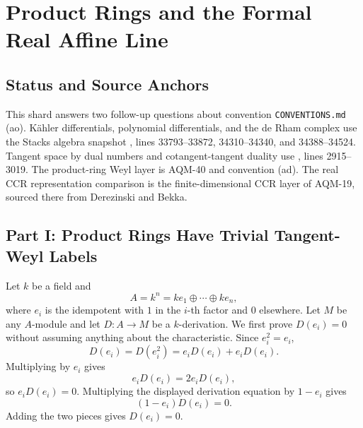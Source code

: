 \section{Product Rings and the Formal Real Affine Line}
\label{sec:product-rings-real-line-cotangent}
\subsection{Status and Source Anchors}
This shard answers two follow-up questions about convention
\texttt{CONVENTIONS.md} (ao).  K\"ahler differentials, polynomial
differentials, and the de Rham complex use the Stacks algebra snapshot
, lines
33793--33872, 34310--34340, and 34388--34524.  Tangent space by dual numbers
and cotangent-tangent duality use
, lines
2915--3019.  The product-ring Weyl layer is AQM-40 and convention (ad).  The
real CCR representation comparison is the finite-dimensional CCR layer of
AQM-19, sourced there from Derezinski and Bekka.
\subsection{Part I: Product Rings Have Trivial Tangent-Weyl Labels}
Let \(k\) be a field and
\[
  A=k^n=k e_1\oplus\cdots\oplus k e_n,
\]
where \(e_i\) is the idempotent with \(1\) in the \(i\)-th factor and \(0\)
elsewhere.  Let \(M\) be any \(A\)-module and let \(D:A\to M\) be a
\(k\)-derivation.  We first prove \(D(e_i)=0\) without assuming anything
about the characteristic.  Since \(e_i^2=e_i\),
\[
  D(e_i)=D(e_i^2)=e_iD(e_i)+e_iD(e_i).
\]
Multiplying by \(e_i\) gives
\[
  e_iD(e_i)=2e_iD(e_i),
\]
so \(e_iD(e_i)=0\).  Multiplying the displayed derivation equation by
\(1-e_i\) gives
\[
  (1-e_i)D(e_i)=0.
\]
Adding the two pieces gives \(D(e_i)=0\).

